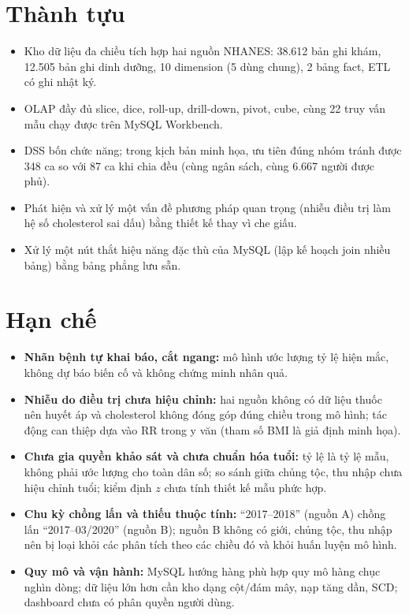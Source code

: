 \section{Thành tựu}
\begin{itemize}
\item Kho dữ liệu đa chiều tích hợp hai nguồn NHANES: 38.612 bản ghi khám, 12.505 bản ghi dinh dưỡng, 10 dimension (5 dùng chung), 2 bảng fact, ETL có ghi nhật ký.
\item OLAP đầy đủ slice, dice, roll-up, drill-down, pivot, cube, cùng 22 truy vấn mẫu chạy được trên MySQL Workbench.
\item DSS bốn chức năng; trong kịch bản minh họa, ưu tiên đúng nhóm tránh được 348 ca so với 87 ca khi chia đều (cùng ngân sách, cùng 6.667 người được phủ).
\item Phát hiện và xử lý một vấn đề phương pháp quan trọng (nhiễu điều trị làm hệ số cholesterol sai dấu) bằng thiết kế thay vì che giấu.
\item Xử lý một nút thắt hiệu năng đặc thù của MySQL (lập kế hoạch join nhiều bảng) bằng bảng phẳng lưu sẵn.
\end{itemize}

\section{Hạn chế}\label{sec:limits}
\begin{itemize}
\item \textbf{Nhãn bệnh tự khai báo, cắt ngang:} mô hình ước lượng tỷ lệ hiện mắc, không dự báo biến cố và không chứng minh nhân quả.
\item \textbf{Nhiễu do điều trị chưa hiệu chỉnh:} hai nguồn không có dữ liệu thuốc nên huyết áp và cholesterol không đóng góp đúng chiều trong mô hình; tác động can thiệp dựa vào RR trong y văn (tham số BMI là giả định minh họa).
\item \textbf{Chưa gia quyền khảo sát và chưa chuẩn hóa tuổi:} tỷ lệ là tỷ lệ mẫu, không phải ước lượng cho toàn dân số; so sánh giữa chủng tộc, thu nhập chưa hiệu chỉnh tuổi; kiểm định $z$ chưa tính thiết kế mẫu phức hợp.
\item \textbf{Chu kỳ chồng lấn và thiếu thuộc tính:} ``2017--2018'' (nguồn A) chồng lấn ``2017--03/2020'' (nguồn B); nguồn B không có giới, chủng tộc, thu nhập nên bị loại khỏi các phân tích theo các chiều đó và khỏi huấn luyện mô hình.
\item \textbf{Quy mô và vận hành:} MySQL hướng hàng phù hợp quy mô hàng chục nghìn dòng; dữ liệu lớn hơn cần kho dạng cột/đám mây, nạp tăng dần, SCD; dashboard chưa có phân quyền người dùng.
\end{itemize}

